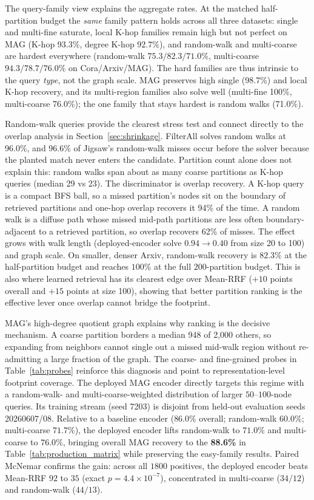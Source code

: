 \documentclass[runningheads]{llncs}
\begin{document}
\label{sec:family}
The query-family view explains the aggregate rates. At the matched half-partition budget the \emph{same} family pattern holds across all three datasets: single and multi-fine saturate, local K-hop families remain high but not perfect on MAG (K-hop $93.3\%$, degree K-hop $92.7\%$), and random-walk and multi-coarse are hardest everywhere (random-walk $75.3/82.3/71.0\%$, multi-coarse $94.3/78.7/76.0\%$ on Cora/Arxiv/MAG). The hard families are thus intrinsic to the query \emph{type}, not the graph scale. MAG preserves high single (98.7\%) and local K-hop recovery, and its multi-region families also solve well (multi-fine 100\%, multi-coarse 76.0\%); the one family that stays hardest is random walks (71.0\%).

Random-walk queries provide the clearest stress test and connect directly to the overlap analysis in Section~\ref{sec:shrinkage}. FilterAll solves random walks at 96.0\%, and 96.6\% of Jigsaw's random-walk misses occur before the solver because the planted match never enters the candidate. Partition count alone does not explain this: random walks span about as many coarse partitions as K-hop queries (median 29 vs 23). The discriminator is overlap recovery. A K-hop query is a compact BFS ball, so a missed partition's nodes sit on the boundary of retrieved partitions and one-hop overlap recovers it 94\% of the time. A random walk is a diffuse path whose missed mid-path partitions are less often boundary-adjacent to a retrieved partition, so overlap recovers 62\% of misses. The effect grows with walk length (deployed-encoder solve $0.94\!\to\!0.40$ from size 20 to 100) and graph scale. On smaller, denser Arxiv, random-walk recovery is $82.3\%$ at the half-partition budget and reaches $100\%$ at the full $200$-partition budget. This is also where learned retrieval has its clearest edge over Mean-RRF ($+10$ points overall and $+15$ points at size 100), showing that better partition ranking is the effective lever once overlap cannot bridge the footprint.

MAG's high-degree quotient graph explains why ranking is the decisive mechanism. A coarse partition borders a median 948 of 2{,}000 others, so expanding from neighbors cannot single out a missed mid-walk region without re-admitting a large fraction of the graph. The coarse- and fine-grained probes in Table~\ref{tab:probes} reinforce this diagnosis and point to representation-level footprint coverage. The deployed MAG encoder directly targets this regime with a random-walk- and multi-coarse-weighted distribution of larger $50$--$100$-node queries. Its training stream (seed 7203) is disjoint from held-out evaluation seeds 20260607/08. Relative to a baseline encoder ($86.0\%$ overall; random-walk $60.0\%$; multi-coarse $71.7\%$), the deployed encoder lifts random-walk to $71.0\%$ and multi-coarse to $76.0\%$, bringing overall MAG recovery to the \textbf{88.6\%} in Table~\ref{tab:production_matrix} while preserving the easy-family results. Paired McNemar confirms the gain: across all $1800$ positives, the deployed encoder beats Mean-RRF $92$ to $35$ (exact $p{=}4.4{\times}10^{-7}$), concentrated in multi-coarse ($34/12$) and random-walk ($44/13$).
\end{document}
